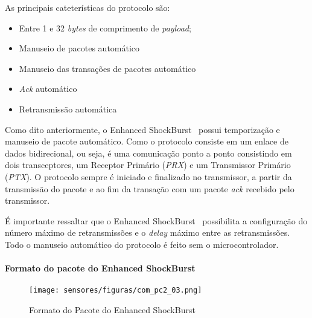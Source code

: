 
As principais cateterísticas do protocolo são:
\begin{itemize}
\item Entre 1 e 32 \emph{bytes} de comprimento de \emph{payload};
\item Manuseio de pacotes automático
\item Manuseio das transações de pacotes automático
	\item \emph{Ack} automático
	\item Retransmissão automática
\end{itemize}


Como dito anteriormente, o Enhanced ShockBurst\texttrademark ~ possui temporização e manuseio de pacote automático. Como o protocolo consiste em um enlace de dados bidirecional, ou seja, é uma comunicação ponto a ponto consistindo em dois transceptores, um Receptor Primário (\emph{PRX}) e um Transmissor Primário (\emph{PTX}). O protocolo sempre é iniciado e finalizado no transmissor, a partir da transmissão do pacote e ao fim da transação com um pacote \emph{ack} recebido pelo transmissor. 

É importante ressaltar que o Enhanced ShockBurst\texttrademark ~ possibilita a configuração do número máximo de retransmissões e o \emph{delay} máximo entre as retransmissões. Todo o manuseio automático do protocolo é feito sem o microcontrolador. 

\paragraph*{Formato do pacote do Enhanced ShockBurst\texttrademark}

\begin{figure}[H]
\centering
	\label{com_pc2_03}
	\texttt{[image: sensores/figuras/com\_pc2\_03.png]}
   \caption{Formato do Pacote do Enhanced ShockBurst\texttrademark}
\end{figure}


